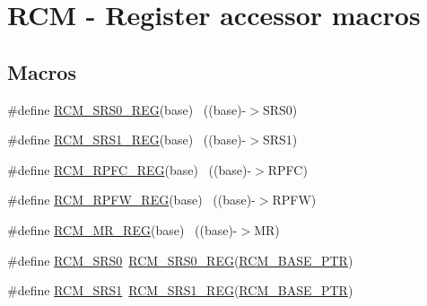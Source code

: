 \hypertarget{group___r_c_m___register___accessor___macros}{}\section{R\+CM -\/ Register accessor macros}
\label{group___r_c_m___register___accessor___macros}
\subsection*{Macros}
\begin{DoxyCompactItemize}
\item 
\#define \hyperlink{group___r_c_m___register___accessor___macros_ga9a66988adfb5c993ce955b8ca7ddaa27}{R\+C\+M\+\_\+\+S\+R\+S0\+\_\+\+R\+EG}(base)                                          ~((base)-\/$>$S\+R\+S0)
\item 
\#define \hyperlink{group___r_c_m___register___accessor___macros_gac6b0aff57a904ff809da2670a9b1992a}{R\+C\+M\+\_\+\+S\+R\+S1\+\_\+\+R\+EG}(base)                                          ~((base)-\/$>$S\+R\+S1)
\item 
\#define \hyperlink{group___r_c_m___register___accessor___macros_gaa5beb3c127ae8e82881dbd558ddf4ffb}{R\+C\+M\+\_\+\+R\+P\+F\+C\+\_\+\+R\+EG}(base)                                          ~((base)-\/$>$R\+P\+FC)
\item 
\#define \hyperlink{group___r_c_m___register___accessor___macros_ga5dd502e0c3bac4f307fbb65d51bcf2c7}{R\+C\+M\+\_\+\+R\+P\+F\+W\+\_\+\+R\+EG}(base)                                          ~((base)-\/$>$R\+P\+FW)
\item 
\#define \hyperlink{group___r_c_m___register___accessor___macros_ga1d8c54f5dc3a71defe562b00ec97fd40}{R\+C\+M\+\_\+\+M\+R\+\_\+\+R\+EG}(base)                                              ~((base)-\/$>$MR)
\item 
\#define \hyperlink{group___r_c_m___register___accessor___macros_gaae0200bfd0eb1d7f7fd0d142c21fe92a}{R\+C\+M\+\_\+\+S\+R\+S0}~\hyperlink{group___r_c_m___register___accessor___macros_ga9a66988adfb5c993ce955b8ca7ddaa27}{R\+C\+M\+\_\+\+S\+R\+S0\+\_\+\+R\+EG}(\hyperlink{group___r_c_m___peripheral_ga25ab3aa8d593d455ed36a52c77f88234}{R\+C\+M\+\_\+\+B\+A\+S\+E\+\_\+\+P\+TR})
\item 
\#define \hyperlink{group___r_c_m___register___accessor___macros_gaa2e190bc843511a82e9ec826029fbaaa}{R\+C\+M\+\_\+\+S\+R\+S1}~\hyperlink{group___r_c_m___register___accessor___macros_gac6b0aff57a904ff809da2670a9b1992a}{R\+C\+M\+\_\+\+S\+R\+S1\+\_\+\+R\+EG}(\hyperlink{group___r_c_m___peripheral_ga25ab3aa8d593d455ed36a52c77f88234}{R\+C\+M\+\_\+\+B\+A\+S\+E\+\_\+\+P\+TR})

\end{DoxyCompactItemize}
